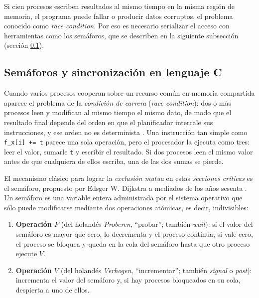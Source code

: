 Si cien procesos escriben resultados al mismo tiempo en la misma región de memoria, el programa puede fallar o producir datos corruptos, el problema conocido como \textit{race condition}. Por eso es necesario serializar el acceso con herramientas como los semáforos, que se describen en la siguiente subsección (sección \ref{sec:cap03:semaforos}).


\subsection{Semáforos y sincronización en lenguaje C}
\label{sec:cap03:semaforos}

Cuando varios procesos cooperan sobre un recurso común en memoria compartida aparece el problema de la \textit{condición de carrera} (\textit{race condition}): dos o más procesos leen y modifican al mismo tiempo el mismo dato, de modo que el resultado final depende del orden en que el planificador intercale sus instrucciones, y ese orden no es determinista \cite{silberschatz:os-concepts:2018}. Una instrucción tan simple como \texttt{f\_x[i] += t} parece una sola operación, pero el procesador la ejecuta como tres: leer el valor, sumarle \texttt{t} y escribir el resultado. Si dos procesos leen el mismo valor antes de que cualquiera de ellos escriba, una de las dos sumas se pierde.

El mecanismo clásico para lograr la \textit{exclusión mutua} en estas \textit{secciones críticas} es el semáforo, propuesto por Edsger W. Dijkstra a mediados de los años sesenta \cite{silberschatz:os-concepts:2018}. Un semáforo es una variable entera administrada por el sistema operativo que sólo puede modificarse mediante dos operaciones atómicas, es decir, indivisibles:

\begin{enumerate}
    \item \textbf{Operación $P$} (del holandés \textit{Proberen}, ``probar''; también \textit{wait}): si el valor del semáforo es mayor que cero, lo decrementa y el proceso continúa; si vale cero, el proceso se bloquea y queda en la cola del semáforo hasta que otro proceso ejecute $V$.
    \item \textbf{Operación $V$} (del holandés \textit{Verhogen}, ``incrementar''; también \textit{signal} o \textit{post}): incrementa el valor del semáforo y, si hay procesos bloqueados en su cola, despierta a uno de ellos.
\end{enumerate}


